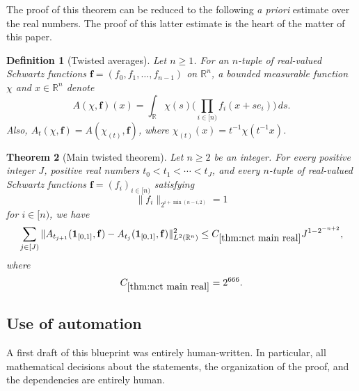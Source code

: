 \documentclass[12pt,reqno]{amsart}
\theoremstyle{plain}
\newtheorem{theorem}{Theorem}[section]
\newtheorem{definition}[theorem]{Definition}
\numberwithin{equation}{section}
\theoremstyle{remark}
\newcommand{\uses}[1]{}
\newcommand{\usesdefs}[1]{}
\newcommand{\R}{{\mathbb R}}
\begin{document}
The proof of this theorem can be reduced to the following {\em a priori} estimate over the real numbers. The proof of this latter estimate is the heart of the matter of this paper.

\begin{definition}[Twisted averages]
Let $n\geq 1$. For an $n$-tuple of real-valued Schwartz functions $\mathbf f = (f_0,f_1,\dots,f_{n-1})$ on $\R^n$, a bounded measurable function $\chi$ and $x\in\mathbb{R}^n$ denote
\begin{equation}\label{A_def}\uses{}\usesdefs{}
A(\chi,\mathbf f)(x) = \int_{\mathbb{R}} \chi(s)\Big(\prod_{i\in [n)} f_i(x+se_i)\Big)\,ds.
\end{equation}
Also, $A_t(\chi,\mathbf{f})=A(\chi_{(t)},\mathbf{f})$, where $\chi_{(t)}(x)=t^{-1}\chi(t^{-1}x)$.
\end{definition}

\begin{theorem}[Main twisted theorem]\label{thm:nct main real}\uses{lem:smoothingdecomp,lem:norm_A_sum_le_sum,lem:mainbump1,lem:mainbump2,lem:leftbump,lem:leftbump1,constant main bump one,constant main bump two,constant left bump,constant left bump one}\usesdefs{A_def}
Let $n\ge 2$ be an integer. For every positive integer $J$, positive real numbers $t_0<t_1<\cdots<t_J$, and every $n$-tuple of real-valued Schwartz functions ${\mathbf f}=(f_i)_{i\in[n)}$ satisfying
\begin{equation}\label{main twisted normalization}
\|f_i\|_{2^{i+\min(n-i,2)}}=1
\end{equation}
for $i\in[n)$, we have
\begin{equation}\label{e:ncommuting_real}
\sum_{j\in[J)}\|A_{t_{j+1}}(\mathbf 1_{[0,1]},\mathbf f)-A_{t_j}(\mathbf 1_{[0,1]},\mathbf f)\|_{L^2(\R^n)}^2
\le C_{\ref{thm:nct main real}}J^{1-2^{-n+2}},
\end{equation}
where
\begin{equation}\label{main twisted theorem constant}
C_{\ref{thm:nct main real}}=2^{666}.
\end{equation}
\end{theorem}

\subsection{Use of automation}\label{sec:comments-on-automation}
A first draft of this blueprint was entirely human-written.
In particular, all mathematical decisions about the statements, the organization of the proof, and the dependencies are entirely human.
\end{document}
